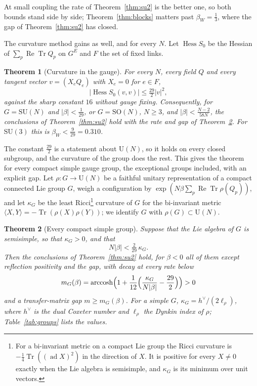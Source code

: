 \documentclass[11pt]{amsart}
\newtheorem{theorem}{Theorem}[section]
\theoremstyle{definition}
\theoremstyle{remark}
\numberwithin{equation}{section}
\newcommand{\SU}{\mathrm{SU}}
\newcommand{\SO}{\mathrm{SO}}
\newcommand{\U}{\mathrm{U}}
\newcommand{\Tr}{\operatorname{Tr}}
\newcommand{\ReTr}{\operatorname{Re}\operatorname{Tr}}
\newcommand{\Hess}{\operatorname{Hess}}
\newcommand{\ip}[2]{\langle #1,#2\rangle}
\begin{document}
At small coupling the rate of Theorem~\ref{thm:su2} is the better one, so
both bounds stand side by side; Theorem~\ref{thm:blocks} matters past
$\beta_W=\frac13$, where the gap of Theorem~\ref{thm:su2} has closed.

The curvature method gains as well, and for every $N$. Let $\Hess S_0$ be
the Hessian of $\sum_p\ReTr Q_p$ on $G^E$ and $F$ the set of fixed links.

\begin{theorem}[Curvature in the gauge]\label{thm:curv}
For every $N$, every field $Q$ and every tangent vector $v=(X_eQ_e)$ with
$X_e=0$ for $e\in F$,
\[
|\Hess S_0(v,v)|\le\tfrac{29}2|v|^2 ,
\]
against the sharp constant $16$ without gauge fixing. Consequently, for
$G=\SU(N)$ and $|\beta|<\frac1{29}$, or $G=\SO(N)$, $N\ge3$, and
$|\beta|<\frac{N-2}{58N}$, the conclusions of Theorem~\ref{thm:su2} hold
with the rate and gap of Theorem~\ref{thm:groups}. For $\SU(3)$ this is
$\beta_W<\frac9{29}=0.310$.
\end{theorem}

The constant $\frac{29}2$ is a statement about $\U(N)$, so it holds on every
closed subgroup, and the curvature of the group does the rest. This gives the
theorem for every compact simple gauge group, the exceptional groups
included, with an explicit gap. Let $\rho:G\to\U(N)$ be a faithful unitary
representation of a compact connected Lie group $G$, weigh a configuration by
$\exp(N\beta\sum_p\ReTr\rho(Q_p))$, and let $\kappa_G$ be the least Ricci\footnote{For a bi-invariant metric on a compact Lie group the Ricci curvature is $-\frac14\Tr((\operatorname{ad}X)^2)$ in the direction of $X$. It is positive for every $X\ne0$ exactly when the Lie algebra is semisimple, and $\kappa_G$ is its minimum over unit vectors.}
curvature of $G$ for the bi-invariant metric $\ip XY=-\Tr(\rho(X)\rho(Y))$;
we identify $G$ with $\rho(G)\subset\U(N)$.

\begin{theorem}[Every compact simple group]\label{thm:groups}
Suppose that the Lie algebra of $G$ is semisimple, so that $\kappa_G>0$, and
that
\[
N|\beta|<\tfrac2{29}\,\kappa_G .
\]
Then the conclusions of Theorem~\ref{thm:su2} hold, for $\beta<0$ all of them
except reflection positivity and the gap, with decay at every rate below
\[
m_G(\beta)=\operatorname{arccosh}\Bigl(1+\frac1{12}\Bigl(\frac{\kappa_G}{N|\beta|}
-\frac{29}2\Bigr)\Bigr)>0
\]
and a transfer-matrix gap $m\ge m_G(\beta)$. For a simple $G$,
$\kappa_G=h^\vee/(2\ell_\rho)$, where $h^\vee$ is the dual Coxeter number and
$\ell_\rho$ the Dynkin index of $\rho$; Table~\ref{tab:groups} lists the
values.
\end{theorem}
\end{document}
